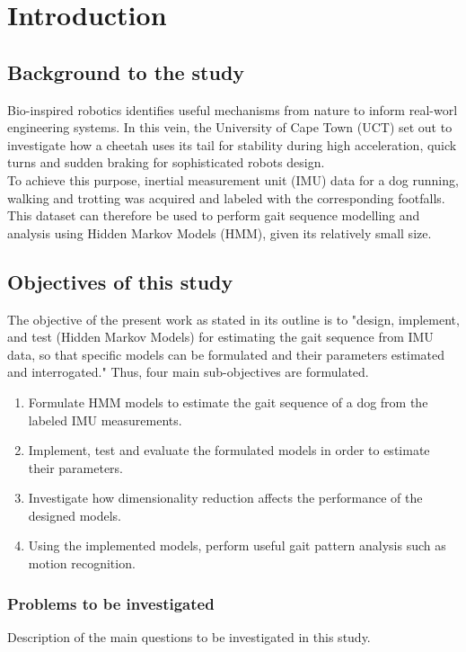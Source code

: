 \chapter{Introduction}

\section{Background to the study}
Bio-inspired robotics identifies useful mechanisms from nature to inform real-worl engineering systems. In this vein, the University of Cape Town (UCT) set out to investigate how a cheetah uses its tail for stability during high acceleration, quick turns and sudden braking for sophisticated robots design. \\
To achieve this purpose, inertial measurement unit (IMU) data for a dog running, walking and trotting was acquired and labeled with the corresponding footfalls.\\
This dataset can therefore be used to perform gait sequence modelling and analysis using Hidden Markov Models (HMM), given its relatively small size. 	%

\section{Objectives of this study}
The objective of the present work as stated in its outline is to "design, implement, and test (Hidden Markov Models) for estimating the gait sequence
from IMU data, so that specific models can be formulated and their
parameters estimated and interrogated." Thus, four main sub-objectives are formulated.
\begin{enumerate}
	\item Formulate HMM models to estimate the gait sequence of a dog from the labeled IMU measurements.
	\item Implement, test and evaluate the formulated models in order to estimate their parameters.
	\item Investigate how dimensionality reduction affects the performance of the designed models.
	\item Using the implemented models, perform useful gait pattern analysis such as motion recognition.
\end{enumerate}


\subsection{Problems to be investigated}
Description of the main questions to be investigated in this study.

